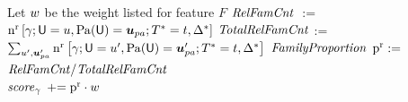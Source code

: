 \documentclass[runningheads,a4paper]{llncs}
\renewcommand{\Qconj}{\Appendterm{\FG{\TT} = \TV} {\QC}} %
\begin{document}
\begin{algorithm}[htbp]
{}
\begin{algorithmic}[1]

\STATE  Let $w $ be the weight listed for feature $F$ 
\STATE {}
	\STATE   $\it{RelFamCnt}$ $ :=$ $\Relcount{{\grounding}; \Appendterm{{\UI}  = \UV} {{\Pa{\UI}} = \Prange{\UT}}} {\Qconj}$
	\STATE $\it{TotalRelFamCnt}$ := $\sum_{\UV',\Prange{\UT}'}\Relcount{ {\grounding}; \Appendterm{{\UI}  = \UV'} {{\Pa{\UI}} = \Prange{\UT}'}} {\Qconj}$
	\STATE  $\it{Family Proportion }$ $ \mathrm{p}^{\mathrm{r}} :=$ $\it{RelFamCnt}/\it{TotalRelFamCnt}$ \\
	\STATE   $\it{score}_{\gamma}$ $\mathrel{+}= \mathrm{p}^{\mathrm{r}}  \cdot  w $
\ENDFOR
\STATE {}
\end{algorithmic}
\caption{Computing Gibbs conditional probabilities, the parameters of the Dependency Network. %
 \textbf{rewrite this in terms of feature F rather than conjunction?} %
\label{alg:log-linear}
}
\end{algorithm}
\end{document}
